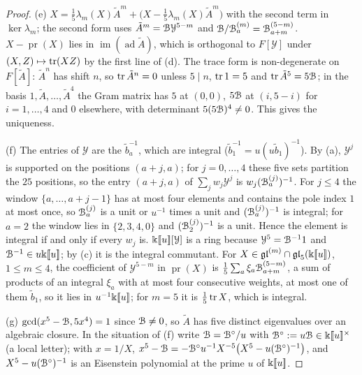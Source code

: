 \begin{proof}
(e) $X=\frac15\lambda_m(X)\tilde A^m+\bigl(X-\frac15\lambda_m(X)\tilde A^m\bigr)$ with the second term in $\ker\lambda_m$; the second form uses $\tilde A^m=\mathcal{B}\mathcal Y^{5-m}$ and $\mathcal{B}/\mathcal{B}^{(m)}_a=\mathcal{B}^{(5-m)}_{a+m}$. $X-\operatorname{pr}(X)$ lies in $\operatorname{im}(\operatorname{ad}\tilde A)$, which is orthogonal to $F[\mathcal Y]$ under $(X,Z)\mapsto\operatorname{tr}(XZ)$ by the first line of (d). The trace form is non-degenerate on $F[\tilde A]$: $\tilde A^n$ has shift $n$, so $\operatorname{tr}\tilde A^n=0$ unless $5\mid n$, $\operatorname{tr}1=5$ and $\operatorname{tr}\tilde A^5=5\mathcal{B}$; in the basis $1,\tilde A,\dots,\tilde A^4$ the Gram matrix has $5$ at $(0,0)$, $5\mathcal{B}$ at $(i,5-i)$ for $i=1,\dots,4$ and $0$ elsewhere, with determinant $5(5\mathcal{B})^4\neq0$. This gives the uniqueness.

(f) The entries of $\mathcal Y$ are the $\tilde b_a^{-1}$, which are integral ($\tilde b_1^{-1}=u(u\tilde b_1)^{-1}$). By (a), $\mathcal Y^j$ is supported on the positions $(a+j,a)$; for $j=0,\dots,4$ these five sets partition the $25$ positions, so the entry $(a+j,a)$ of $\sum_jw_j\mathcal Y^j$ is $w_j(\mathcal{B}^{(j)}_a)^{-1}$. For $j\leq4$ the window $\{a,\dots,a+j-1\}$ has at most four elements and contains the pole index $1$ at most once, so $\mathcal{B}^{(j)}_a$ is a unit or $u^{-1}$ times a unit and $(\mathcal{B}^{(j)}_a)^{-1}$ is integral; for $a=2$ the window lies in $\{2,3,4,0\}$ and $(\mathcal{B}^{(j)}_2)^{-1}$ is a unit. Hence the element is integral if and only if every $w_j$ is. $\Bbbk[\![ u ]\!][\mathcal Y]$ is a ring because $\mathcal Y^5=\mathcal{B}^{-1}1$ and $\mathcal{B}^{-1}\in u\Bbbk[\![ u ]\!]$; by (c) it is the integral commutant. For $X\in\mathfrak{gl}^{(m)}\cap\mathfrak{gl}_5(\Bbbk[\![ u ]\!])$, $1\leq m\leq4$, the coefficient of $\mathcal Y^{5-m}$ in $\operatorname{pr}(X)$ is $\frac15\sum_a\xi_a\mathcal{B}^{(5-m)}_{a+m}$, a sum of products of an integral $\xi_a$ with at most four consecutive weights, at most one of them $\tilde b_1$, so it lies in $u^{-1}\Bbbk[\![ u ]\!]$; for $m=5$ it is $\frac15\operatorname{tr} X$, which is integral.

(g) $\gcd(x^5-\mathcal{B},5x^4)=1$ since $\mathcal{B}\neq0$, so $\tilde A$ has five distinct eigenvalues over an algebraic closure. In the situation of (f) write $\mathcal{B}=\mathcal{B}^\circ/u$ with $\mathcal{B}^\circ:=u\mathcal{B}\in\Bbbk[\![ u ]\!]^\times$ (a local letter); with $x=1/X$, $x^5-\mathcal{B}=-\mathcal{B}^\circ u^{-1}X^{-5}\bigl(X^5-u(\mathcal{B}^\circ)^{-1}\bigr)$, and $X^5-u(\mathcal{B}^\circ)^{-1}$ is an Eisenstein polynomial at the prime $u$ of $\Bbbk[\![ u ]\!]$.
\end{proof}


